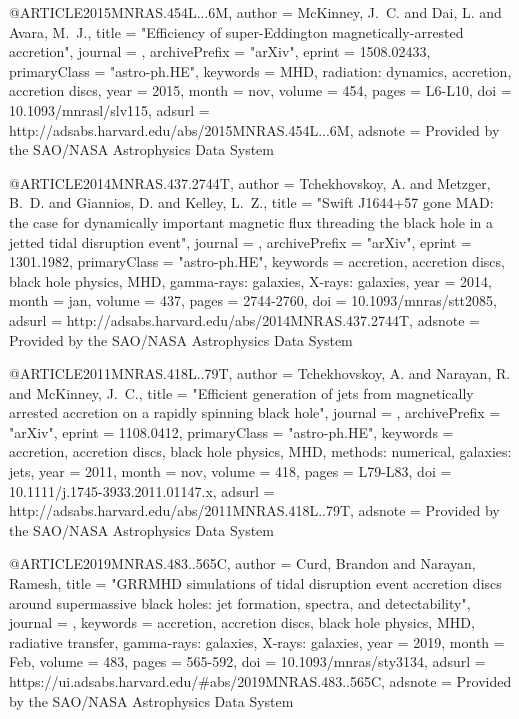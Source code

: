 \documentclass[twocolumn,tighten]{aastex63}
\begin{document}
{{{{@ARTICLE{2015MNRAS.454L...6M,
   author = {{McKinney}, J.~C. and {Dai}, L. and {Avara}, M.~J.},
    title = "{Efficiency of super-Eddington magnetically-arrested accretion}",
  journal = {\mnras},
archivePrefix = "arXiv",
   eprint = {1508.02433},
 primaryClass = "astro-ph.HE",
 keywords = {MHD, radiation: dynamics, accretion, accretion discs},
     year = 2015,
    month = nov,
   volume = 454,
    pages = {L6-L10},
      doi = {10.1093/mnrasl/slv115},
   adsurl = {http://adsabs.harvard.edu/abs/2015MNRAS.454L...6M},
  adsnote = {Provided by the SAO/NASA Astrophysics Data System}
}

@ARTICLE{2014MNRAS.437.2744T,
   author = {{Tchekhovskoy}, A. and {Metzger}, B.~D. and {Giannios}, D. and 
	{Kelley}, L.~Z.},
    title = "{Swift J1644+57 gone MAD: the case for dynamically important magnetic flux threading the black hole in a jetted tidal disruption event}",
  journal = {\mnras},
archivePrefix = "arXiv",
   eprint = {1301.1982},
 primaryClass = "astro-ph.HE",
 keywords = {accretion, accretion discs, black hole physics, MHD, gamma-rays: galaxies, X-rays: galaxies},
     year = 2014,
    month = jan,
   volume = 437,
    pages = {2744-2760},
      doi = {10.1093/mnras/stt2085},
   adsurl = {http://adsabs.harvard.edu/abs/2014MNRAS.437.2744T},
  adsnote = {Provided by the SAO/NASA Astrophysics Data System}
}

@ARTICLE{2011MNRAS.418L..79T,
   author = {{Tchekhovskoy}, A. and {Narayan}, R. and {McKinney}, J.~C.},
    title = "{Efficient generation of jets from magnetically arrested accretion on a rapidly spinning black hole}",
  journal = {\mnras},
archivePrefix = "arXiv",
   eprint = {1108.0412},
 primaryClass = "astro-ph.HE",
 keywords = {accretion, accretion discs, black hole physics, MHD, methods: numerical, galaxies: jets},
     year = 2011,
    month = nov,
   volume = 418,
    pages = {L79-L83},
      doi = {10.1111/j.1745-3933.2011.01147.x},
   adsurl = {http://adsabs.harvard.edu/abs/2011MNRAS.418L..79T},
  adsnote = {Provided by the SAO/NASA Astrophysics Data System}
}

@ARTICLE{2019MNRAS.483..565C,
       author = {{Curd}, Brandon and {Narayan}, Ramesh},
        title = "{GRRMHD simulations of tidal disruption event accretion discs around supermassive black holes: jet formation, spectra, and detectability}",
      journal = {\mnras},
     keywords = {accretion, accretion discs, black hole physics, MHD, radiative transfer, gamma-rays: galaxies, X-rays: galaxies},
         year = 2019,
        month = Feb,
       volume = {483},
        pages = {565-592},
          doi = {10.1093/mnras/sty3134},
       adsurl = {https://ui.adsabs.harvard.edu/\#abs/2019MNRAS.483..565C},
      adsnote = {Provided by the SAO/NASA Astrophysics Data System}
}



}}}}
\end{document}
